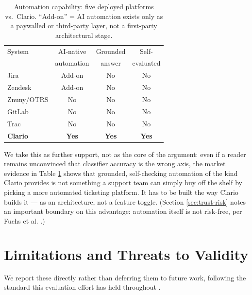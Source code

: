 \documentclass[conference]{IEEEtran}
\begin{document}
\begin{table}[t]
\centering
\caption{Automation capability: five deployed platforms \cite{hampel2024} vs.\ Clario. ``Add-on'' = AI automation exists only as a paywalled or third-party layer, not a first-party architectural stage.}
\label{tab:market-comparison}
\small
\begin{tabular}{@{}lccc@{}}
\toprule
System & AI-native & Grounded & Self- \\
 & automation & answer & evaluated \\
\midrule
Jira & Add-on & No & No \\
Zendesk & Add-on & No & No \\
Znuny/OTRS & No & No & No \\
GitLab & No & No & No \\
Trac & No & No & No \\
\textbf{Clario} & \textbf{Yes} & \textbf{Yes} & \textbf{Yes} \\
\bottomrule
\end{tabular}
\end{table}

We take this as further support, not as the core of the argument: even if a reader remains unconvinced that classifier accuracy is the wrong axis, the market evidence in Table \ref{tab:market-comparison} shows that grounded, self-checking automation of the kind Clario provides is not something a support team can simply buy off the shelf by picking a more automated ticketing platform. It has to be built the way Clario builds it --- as an architecture, not a feature toggle. (Section \ref{sec:trust-risk} notes an important boundary on this advantage: automation itself is not risk-free, per Fuchs et al. \cite{fuchs2022}.)

\section{Limitations and Threats to Validity}
\label{sec:limitations}

We report these directly rather than deferring them to future work, following the standard this evaluation effort has held throughout \cite{ds-eval-proposal}.
\end{document}
